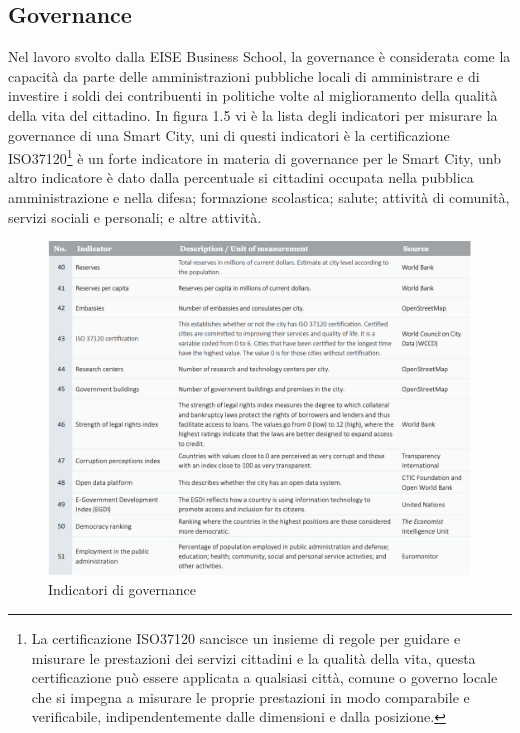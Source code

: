 \subsection{Governance}
Nel lavoro svolto dalla EISE Business School, la governance è considerata come la capacità da parte delle amministrazioni pubbliche locali di amministrare  e di investire i soldi dei contribuenti in politiche volte al miglioramento della qualità della vita del cittadino.
In figura 1.5 vi è la lista degli indicatori per misurare la governance di una Smart City, uni di questi indicatori è la certificazione ISO37120\footnote{La certificazione ISO37120 sancisce un insieme di regole per guidare e misurare le prestazioni dei servizi cittadini e la qualità della vita, questa certificazione può essere applicata a qualsiasi città, comune o governo locale che si impegna a misurare le proprie prestazioni in modo comparabile e verificabile, indipendentemente dalle dimensioni e dalla posizione.} è un forte indicatore in materia di governance per le Smart City, unb altro indicatore è dato dalla percentuale si cittadini occupata nella pubblica amministrazione e nella difesa; formazione scolastica; salute; attività di comunità, servizi sociali e personali; e altre attività.
\begin{figure}[ht]
	\begin{center}
		\includegraphics[width=320bp]{img/indicatori_governance.png}
		\caption{Indicatori di governance}
	\end{center}
\end{figure}

